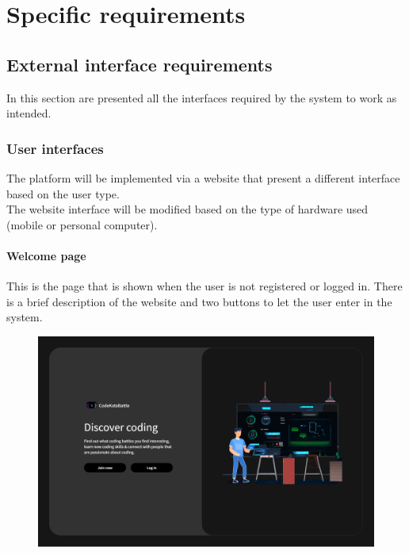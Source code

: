 \documentclass[12pt, a4paper]{report}
\begin{document}
\chapter{Specific requirements}
    \section{External interface requirements}
        In this section are presented all the interfaces required by the system to work as intended. 

        \subsection{User interfaces}
        The platform will be implemented via a website that present a different interface based on the user type. \\
        The website interface will be modified based on the type of hardware used (mobile or personal computer). 

        \subsubsection{Welcome page} 
        This is the page that is shown when the user is not registered or logged in. 
        There is a brief description of the website and two buttons to let the user enter in the system. 
        \begin{figure}[H]
            \centering
            \includegraphics[width=0.8\linewidth]{images/welcome.png}
        \end{figure}
\end{document}
